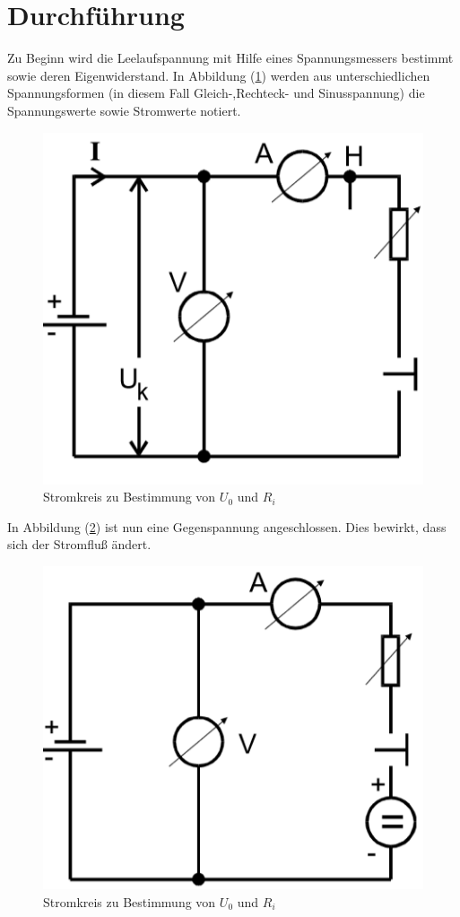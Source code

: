 \section{Durchführung}
Zu Beginn wird die Leelaufspannung mit Hilfe eines Spannungsmessers bestimmt sowie deren Eigenwiderstand.
In Abbildung (\ref{abb:2}) werden aus unterschiedlichen Spannungsformen (in diesem Fall Gleich-,Rechteck- und Sinusspannung)
die Spannungswerte sowie Stromwerte notiert.
\begin{figure}[H]
  \centering
  \includegraphics[width= 10 cm , height=7 cm]{Bild2.png}
  \caption{Stromkreis zu Bestimmung von $U_0$ und $R_i$ \cite{1}}
  \label{abb:2}
\end{figure}
In Abbildung (\ref{abb:3}) ist nun eine Gegenspannung angeschlossen. Dies bewirkt, dass sich der Stromfluß
ändert.
\begin{figure}[H]
  \centering
  \includegraphics[width=10 cm, height= 7 cm]{Bild3.png}
  \caption{Stromkreis zu Bestimmung von $U_0$ und $R_i$ \cite{1}}
  \label{abb:3}
\end{figure}
